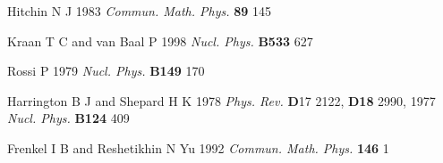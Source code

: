 \documentclass[a4paper,10pt]{article}
\begin{document}
\begin{thebibliography}{99}
 Hitchin N J 1983 {\it Commun. Math. Phys.} \textbf{89} 145

 Kraan T C and van Baal P 1998 {\it Nucl. Phys.} \textbf{B533} 627

 Rossi P 1979 {\it Nucl. Phys.} \textbf{B149} 170

 Harrington B J and Shepard H K 1978 {\it Phys. Rev.} {\textbf D17} 2122, \textbf{D18} 2990, 1977 {\it Nucl. Phys.} \textbf{B124} 409

 Frenkel I B and Reshetikhin N Yu 1992 {\it Commun. Math. Phys.} \textbf{146} 1

\end{thebibliography}
\end{document}
